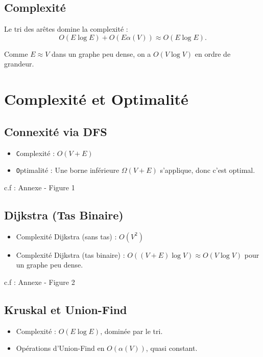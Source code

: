 \documentclass[a4paper,12pt]{article}
\begin{document}
\subsection{Complexité}

Le tri des arêtes domine la complexité :
\[
O(E \log E) + O(E \alpha(V)) \approx O(E \log E).
\]

Comme $E \approx V$ dans un graphe peu dense, on a $O(V \log V)$ en ordre de grandeur.

\section{Complexité et Optimalité}

\subsection{Connexité via DFS}

\begin{itemize}
	\item \texttt Complexité : $O(V+E)$
	\item \texttt Optimalité : Une borne inférieure $\Omega(V+E)$ s’applique, donc c’est optimal.
\end{itemize}

\begin{center}
c.f : Annexe - Figure 1
\end{center}

\subsection{Dijkstra (Tas Binaire)}

\begin{itemize}
	\item Complexité Dijkstra (sans tas) : $O(V^2)$
	\item Complexité Dijkstra (tas binaire) : $O((V+E)\log V) \approx O(V \log V)$ pour un graphe peu dense.
\end{itemize}

\begin{center}
c.f : Annexe - Figure 2
\end{center}

\subsection{Kruskal et Union-Find}

\begin{itemize}
 \item Complexité : $O(E \log E)$, dominée par le tri.
 \item Opérations d’Union-Find en $O(\alpha(V))$, quasi constant.
\end{itemize}
\end{document}
